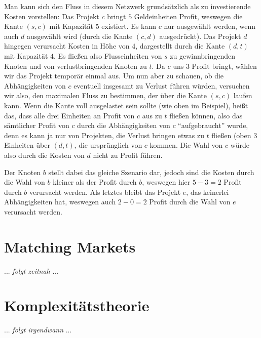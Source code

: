 \documentclass{panikzettel}
\begin{document}
Man kann sich den Fluss in diesem Netzwerk grundsätzlich als zu investierende Kosten vorstellen: Das Projekt $c$ bringt $5$ Geldeinheiten Profit, weswegen die Kante $(s,c)$ mit Kapazität $5$ existiert. Es kann $c$ nur ausgewählt werden, wenn auch $d$ ausgewählt wird (durch die Kante $(c,d)$ ausgedrückt). Das Projekt $d$ hingegen verursacht Kosten in Höhe von $4$, dargestellt durch die Kante $(d,t)$ mit Kapazität $4$. Es fließen also Flusseinheiten von $s$ zu gewinnbringenden Knoten und von verlustbringenden Knoten zu $t$. Da $c$ uns $3$ Profit bringt, wählen wir das Projekt temporär einmal aus. Um nun aber zu schauen, ob die Abhängigkeiten von $c$ eventuell insgesamt zu Verlust führen würden, versuchen wir also, den maximalen Fluss zu bestimmen, der über die Kante $(s,c)$ laufen kann. Wenn die Kante voll ausgelastet sein sollte (wie oben im Beispiel), heißt das, dass alle drei Einheiten an Profit von $c$ aus zu $t$ fließen können, also das sämtlicher Profit von $c$ durch die Abhängigkeiten von $c$ ``aufgebraucht'' wurde, denn es kann ja nur von Projekten, die Verlust bringen etwas zu $t$ fließen (oben $3$ Einheiten über $(d,t)$, die ursprünglich von $c$ kommen. Die Wahl von $c$ würde also durch die Kosten von $d$ nicht zu Profit führen.

Der Knoten $b$ stellt dabei das gleiche Szenario dar, jedoch sind die Kosten durch die Wahl von $b$ kleiner als der Profit durch $b$, weswegen hier $5-3 = 2$ Profit durch $b$ verursacht werden. Als letztes bleibt das Projekt $e$, das keinerlei Abhängigkeiten hat, weswegen auch $2-0= 2$ Profit durch die Wahl von $e$ verursacht werden. 
 
\section{Matching Markets}

... \textit{folgt zeitnah} ...

\section{Komplexitätstheorie}

... \textit{folgt irgendwann} ...
\end{document}
